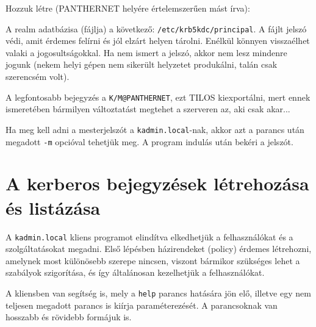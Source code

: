 
\newpage
Hozzuk létre (PANTHERNET helyére értelemszerűen mást írva):


A realm adatbázisa (fájlja) a következő: \texttt{/etc/krb5kdc/principal}. A fájlt jelszó védi, amit érdemes felírni és
jól elzárt helyen tárolni. Enélkül könnyen visszaélhet valaki a jogosultságokkal. Ha nem ismert a jelszó, akkor nem
lesz mindenre jogunk (nekem helyi gépen nem sikerült helyzetet produkálni, talán csak szerencsém volt).

A legfontosabb bejegyzés a \texttt{K/M@PANTHERNET}, ezt TILOS kiexportálni, mert ennek ismeretében bármilyen
változtatást megtehet a szerveren az, aki csak akar...

Ha meg kell adni a mesterjelszót a \texttt{kadmin.local}-nak, akkor azt a parancs után megadott \texttt{-m} opcióval
tehetjük meg. A program indulás után bekéri a jelszót.

\section{A kerberos bejegyzések létrehozása és listázása}
A \texttt{kadmin.local} kliens programot elindítva elkedhetjük a felhasználókat és a szolgáltatásokat megadni. Első lépésben
házirendeket (policy) érdemes létrehozni, amelynek most különösebb szerepe nincsen, viszont bármikor szükséges lehet a
szabályok szigorítása, és így általánosan kezelhetjük a felhasználókat.

A kliensben van segítség is, mely a \texttt{help} parancs hatására jön elő, illetve egy nem teljesen megadott parancs
is kiírja paraméterezését. A parancsoknak van hosszabb és rövidebb formájuk is.

